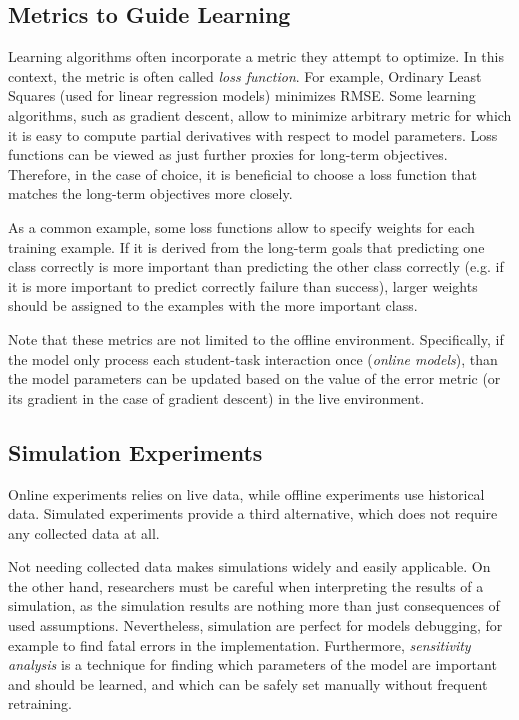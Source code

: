 \subsection{Metrics to Guide Learning}
\label{sec:metrics-to-guide-learning}

Learning algorithms often incorporate a metric they attempt to optimize.
In this context, the metric is often called \emph{loss function}.
For example,
  Ordinary Least Squares (used for linear regression models) minimizes RMSE.
Some learning algorithms, such as gradient descent,
  allow to minimize arbitrary metric
  for which it is easy to compute partial derivatives with respect to model parameters.
Loss functions can be viewed as just further proxies for long-term objectives.
Therefore, in the case of choice, it is beneficial to choose a loss function
  that matches the long-term objectives more closely.

As a common example, some loss functions allow to specify weights for each training example.
If it is derived from the long-term goals that predicting one class correctly
  is more important than predicting the other class correctly
  (e.g. if it is more important to predict correctly failure than success),
  larger weights should be assigned to the examples with the more important class.

Note that these metrics are not limited to the offline environment. Specifically, if the
model only process each student-task interaction once (\emph{online models}), than the
model parameters can be updated based on the value of the error metric
(or its gradient in the case of gradient descent) in the live environment.

\subsection{Simulation Experiments}

Online experiments relies on live data,
while offline experiments use historical data.
Simulated experiments provide a third alternative,
  which does not require any collected data at all.

Not needing collected data makes simulations widely and easily applicable.
On the other hand, researchers must be careful when interpreting
  the results of a simulation, as the simulation results are nothing more than
  just consequences of used assumptions.
Nevertheless, simulation are perfect for models debugging,
  for example to find fatal errors in the implementation.
Furthermore, \emph{sensitivity analysis} is a technique for finding
  which parameters of the model are important and should be learned,
  and which can be safely set manually without frequent retraining.

